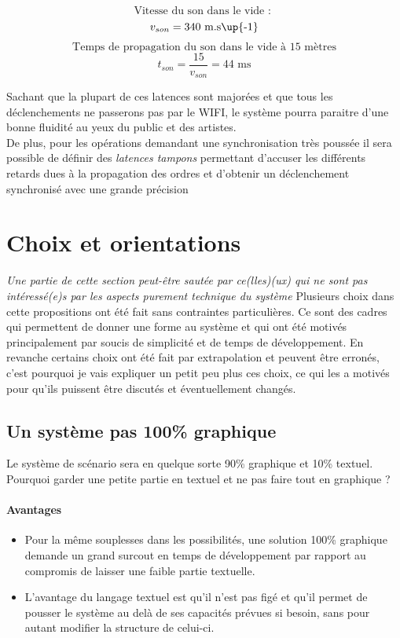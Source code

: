 	\[ \text{Vitesse du son dans le vide : }\]
	\[ v_{son} = 340 \text{~m.s\up{-1}} \]
	\[ \text{Temps de propagation du son dans le vide à 15 mètres} \]
	\[ t_{son} = \frac{15}{v_{son}} = 44 \text{~ms} \]

Sachant que la plupart de ces latences sont majorées et que tous les déclenchements ne passerons pas par le WIFI, le système pourra paraitre d'une bonne fluidité au yeux du public et des artistes.\\
De plus, pour les opérations demandant une synchronisation très poussée il sera possible de définir des \textit{latences tampons} permettant d'accuser les différents retards dues à la propagation des ordres et d'obtenir un déclenchement synchronisé avec une grande précision

\section{Choix et orientations}
\indent \textit{Une partie de cette section peut-être sautée par ce(lles)(ux) qui ne sont pas intéressé(e)s par les aspects purement technique du système}\p
Plusieurs choix dans cette propositions ont été fait sans contraintes particulières. Ce sont des cadres qui permettent de donner une forme au système et qui ont été motivés principalement par soucis de simplicité et de temps de développement. En revanche certains choix ont été fait par extrapolation et peuvent être erronés, c'est pourquoi je vais expliquer un petit peu plus ces choix, ce qui les a motivés pour qu'ils puissent être discutés et éventuellement changés.

\subsection{Un système pas 100\% graphique}
Le système de scénario sera en quelque sorte 90\% graphique et 10\% textuel. Pourquoi garder une petite partie en textuel et ne pas faire tout en graphique ?
\paragraph{Avantages}
\begin{itemize}
\item Pour la même souplesses dans les possibilités, une solution 100\% graphique demande un grand surcout en temps de développement par rapport au compromis de laisser une faible partie textuelle.
\item L'avantage du langage textuel est qu'il n'est pas figé et qu'il permet de pousser le système au delà de ses capacités prévues si besoin, sans pour autant modifier la structure de celui-ci.
\end{itemize}
